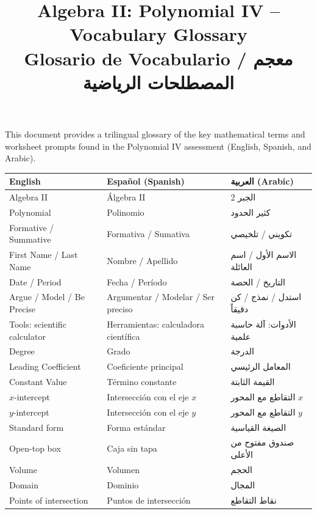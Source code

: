 \documentclass[10pt]{article}
\title{\textbf{Algebra II: Polynomial IV -- Vocabulary Glossary} \\ 
\small Glosario de Vocabulario / معجم المصطلحات الرياضية}
\author{}
\date{}
\begin{document}
\maketitle

\noindent This document provides a trilingual glossary of the key mathematical terms and worksheet prompts found in the Polynomial IV assessment (English, Spanish, and Arabic).

\vspace{1em}

\noindent
\begin{tabularx}{\textwidth}{|X|X|X|}
\hline
\textbf{English} & \textbf{Español (Spanish)} & \textbf{العربية (Arabic)} \\
\hline
Algebra II & Álgebra II & \textarabic{الجبر 2} \\
\hline
Polynomial & Polinomio & \textarabic{كثير الحدود} \\
\hline
Formative / Summative & Formativa / Sumativa & \textarabic{تكويني / تلخيصي} \\
\hline
First Name / Last Name & Nombre / Apellido & \textarabic{الاسم الأول / اسم العائلة} \\
\hline
Date / Period & Fecha / Período & \textarabic{التاريخ / الحصة} \\
\hline
Argue / Model / Be Precise & Argumentar / Modelar / Ser preciso & \textarabic{استدل / نمذج / كن دقيقاً} \\
\hline
Tools: scientific calculator & Herramientas: calculadora científica & \textarabic{الأدوات: آلة حاسبة علمية} \\
\hline
Degree & Grado & \textarabic{الدرجة} \\
\hline
Leading Coefficient & Coeficiente principal & \textarabic{المعامل الرئيسي} \\
\hline
Constant Value & Término constante & \textarabic{القيمة الثابتة} \\
\hline
$x$-intercept & Intersección con el eje $x$ & \textarabic{التقاطع مع المحور $x$} \\
\hline
$y$-intercept & Intersección con el eje $y$ & \textarabic{التقاطع مع المحور $y$} \\
\hline
Standard form & Forma estándar & \textarabic{الصيغة القياسية} \\
\hline
Open-top box & Caja sin tapa & \textarabic{صندوق مفتوح من الأعلى} \\
\hline
Volume & Volumen & \textarabic{الحجم} \\
\hline
Domain & Dominio & \textarabic{المجال} \\
\hline
Points of intersection & Puntos de intersección & \textarabic{نقاط التقاطع} \\
\hline
\end{tabularx}
\end{document}
